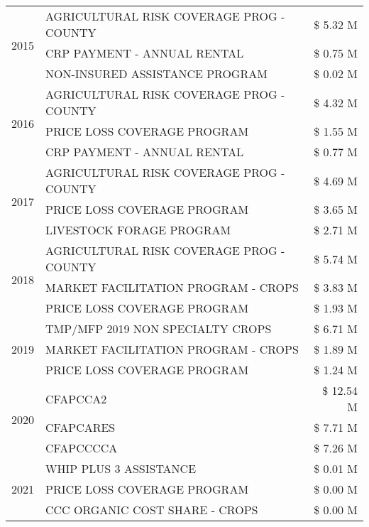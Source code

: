 \begin{tabular}{llr}
\cline{1-3}
\multirow[t]{3}{*}{2015} & AGRICULTURAL RISK COVERAGE PROG - COUNTY & \$ 5.32 M \\
 & CRP PAYMENT - ANNUAL RENTAL & \$ 0.75 M \\
 & NON-INSURED ASSISTANCE PROGRAM & \$ 0.02 M \\
\cline{1-3}
\multirow[t]{3}{*}{2016} & AGRICULTURAL RISK COVERAGE PROG - COUNTY & \$ 4.32 M \\
 & PRICE LOSS COVERAGE PROGRAM & \$ 1.55 M \\
 & CRP PAYMENT - ANNUAL RENTAL & \$ 0.77 M \\
\cline{1-3}
\multirow[t]{3}{*}{2017} & AGRICULTURAL RISK COVERAGE PROG - COUNTY & \$ 4.69 M \\
 & PRICE LOSS COVERAGE PROGRAM & \$ 3.65 M \\
 & LIVESTOCK FORAGE PROGRAM & \$ 2.71 M \\
\cline{1-3}
\multirow[t]{3}{*}{2018} & AGRICULTURAL RISK COVERAGE PROG - COUNTY & \$ 5.74 M \\
 & MARKET FACILITATION PROGRAM - CROPS & \$ 3.83 M \\
 & PRICE LOSS COVERAGE PROGRAM & \$ 1.93 M \\
\cline{1-3}
\multirow[t]{3}{*}{2019} & TMP/MFP 2019 NON SPECIALTY CROPS & \$ 6.71 M \\
 & MARKET FACILITATION PROGRAM - CROPS & \$ 1.89 M \\
 & PRICE LOSS COVERAGE PROGRAM & \$ 1.24 M \\
\cline{1-3}
\multirow[t]{3}{*}{2020} & CFAPCCA2 & \$ 12.54 M \\
 & CFAPCARES & \$ 7.71 M \\
 & CFAPCCCCA & \$ 7.26 M \\
\cline{1-3}
\multirow[t]{3}{*}{2021} & WHIP PLUS 3 ASSISTANCE & \$ 0.01 M \\
 & PRICE LOSS COVERAGE PROGRAM & \$ 0.00 M \\
 & CCC ORGANIC COST SHARE - CROPS & \$ 0.00 M \\
\cline{1-3}
\bottomrule
\end{tabular}
